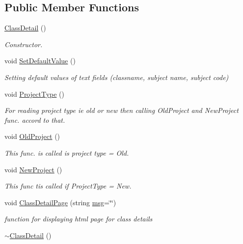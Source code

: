 \subsection*{Public Member Functions}
\begin{DoxyCompactItemize}
\item 
\hypertarget{classClassDetail_a70975c4ff964e21958e31f2020cdc643}{\hyperlink{classClassDetail_a70975c4ff964e21958e31f2020cdc643}{Class\-Detail} ()}\label{classClassDetail_a70975c4ff964e21958e31f2020cdc643}

\begin{DoxyCompactList}\small\item\em Constructor. \end{DoxyCompactList}\item 
\hypertarget{classClassDetail_a2e2384f482bb2dca5f2d8a1c27491ae9}{void \hyperlink{classClassDetail_a2e2384f482bb2dca5f2d8a1c27491ae9}{Set\-Default\-Value} ()}\label{classClassDetail_a2e2384f482bb2dca5f2d8a1c27491ae9}

\begin{DoxyCompactList}\small\item\em Setting default values of text fields (classname, subject name, subject code) \end{DoxyCompactList}\item 
\hypertarget{classClassDetail_a360bb591c7b1559d1b6bac0609dbad1e}{void \hyperlink{classClassDetail_a360bb591c7b1559d1b6bac0609dbad1e}{Project\-Type} ()}\label{classClassDetail_a360bb591c7b1559d1b6bac0609dbad1e}

\begin{DoxyCompactList}\small\item\em For reading project type ie old or new then calling Old\-Project and New\-Project func. accord to that. \end{DoxyCompactList}\item 
void \hyperlink{classClassDetail_af8cb05bf1c3d5581edddcdab96def081}{Old\-Project} ()
\begin{DoxyCompactList}\small\item\em This func. is called is project type = Old. \end{DoxyCompactList}\item 
void \hyperlink{classClassDetail_a521c8e315fa844a04932382ae85335bf}{New\-Project} ()
\begin{DoxyCompactList}\small\item\em This func tis called if Project\-Type = New. \end{DoxyCompactList}\item 
void \hyperlink{classClassDetail_a645fe4306391def818cdadbdc3febbf7}{Class\-Detail\-Page} (string \hyperlink{classInputDetail_a1abb16cd695678c3fa05e3c812823fee}{msg}=\char`\"{}\char`\"{})
\begin{DoxyCompactList}\small\item\em function for displaying html page for class details \end{DoxyCompactList}\item 
\hypertarget{classClassDetail_a2aeaf33b0a277a897aad308cffde211a}{\hyperlink{classClassDetail_a2aeaf33b0a277a897aad308cffde211a}{$\sim$\-Class\-Detail} ()}\label{classClassDetail_a2aeaf33b0a277a897aad308cffde211a}


\end{DoxyCompactItemize}
